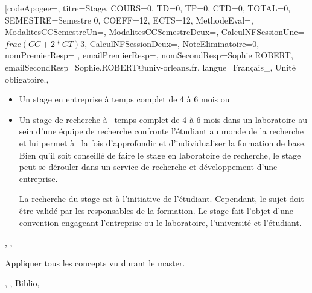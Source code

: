 \module[codeApogee={},
titre={Stage},
COURS={0},
TD={0},
TP={0},
CTD={0},
TOTAL={0},
SEMESTRE={Semestre 0},
COEFF={12},
ECTS={12},
MethodeEval={},
ModalitesCCSemestreUn={},
ModalitesCCSemestreDeux={},
CalculNFSessionUne={$frac{(CC+2*CT)}{3}$},
CalculNFSessionDeux={},
NoteEliminatoire={0},
nomPremierResp={ },
emailPremierResp={},
nomSecondResp={Sophie ROBERT},
emailSecondResp={Sophie.ROBERT@univ-orleans.fr},
langue={Français_},
{Unité obligatoire.},
{\begin{itemize}
\item Un stage en entreprise à temps complet de 4 à 6 mois ou
\item Un stage de recherche  à  temps complet de 4 à 6 mois dans un laboratoire au sein d'une équipe de
recherche confronte l'étudiant au monde de la recherche et lui permet à  la fois d'approfondir et d'individualiser
la formation de base. Bien qu'il soit conseillé de faire le stage en laboratoire de recherche, le stage peut se dérouler
dans un service de recherche et développement d'une entreprise.

La recherche du stage est à l'initiative de l'étudiant.
Cependant, le sujet doit être validé par les responsables de la formation. Le stage fait l'objet d'une convention
engageant l'entreprise ou le laboratoire, l'université et l'étudiant.
\end{itemize}},
{},
{\begin{itemize}
\ObjItem Appliquer tous les concepts vu durant le master.
\end{itemize}},
{},
{Biblio},

\vfill


